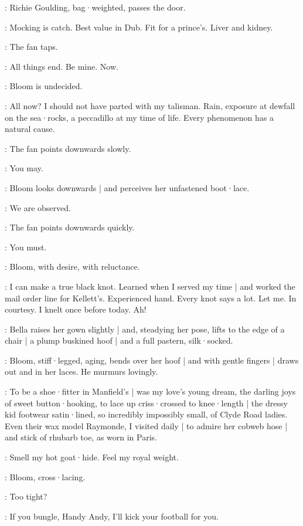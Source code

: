 :
Richie Goulding,
bag·weighted,
passes the door.

\Richie:
Mocking is catch.
Best value in Dub.
Fit for a prince's.
%
Liver and kidney.

:
The fan taps.

\Fan:
All things end.
Be mine.
Now.

:
Bloom is undecided.

\Bloom:
All now?
I should not have parted with my talisman.
Rain,
exposure at dewfall on the sea·rocks,
a peccadillo at my time of life.
Every phenomenon has a natural cause.

:
The fan points downwards slowly.

\Fan:
You may.

:
Bloom looks downwards |
and perceives her unfastened boot·lace.

\Bloom:
We are observed.

:
The fan points downwards quickly.

\Fan:
You must.

:
Bloom,
with desire,
with reluctance.

\Bloom:
I can make a true black knot.
Learned when I served my time |
and worked the mail order line for Kellett's.
Experienced hand.
Every knot says a lot.
Let me.
In courtesy.
I knelt once before today.
Ah!

:
Bella raises her gown slightly |
and,
steadying her pose,
lifts to the edge of a chair |
a plump buskined hoof |
%
and a full pastern,
silk·socked.

:
Bloom,
stiff·legged,
aging,
bends over her hoof |
and with gentle fingers |
draws out and in her laces.
He murmurs lovingly.

\Bloom:
To be a shoe·fitter in Manfield's |
was my love's young dream,
the darling joys of sweet button·hooking,
to lace up criss·crossed to knee·length |
the dressy kid footwear satin·lined,
so incredibly impossibly small,
of Clyde Road ladies.
Even their wax model Raymonde,
I visited daily |
to admire her cobweb hose |
and stick of rhubarb toe,
as worn in Paris.

\Hoof[1b]:
Smell my hot goat·hide.
%
Feel my royal weight.

:
Bloom,
cross·lacing.

\Bloom:
Too tight?

\Hoof:
If you bungle,
Handy Andy,
I'll kick your football for you.

